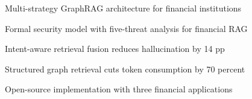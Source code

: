 \begin{highlights}
\item Multi-strategy GraphRAG architecture for financial institutions
\item Formal security model with five-threat analysis for financial RAG
\item Intent-aware retrieval fusion reduces hallucination by 14 pp
\item Structured graph retrieval cuts token consumption by 70 percent
\item Open-source implementation with three financial applications
\end{highlights}
